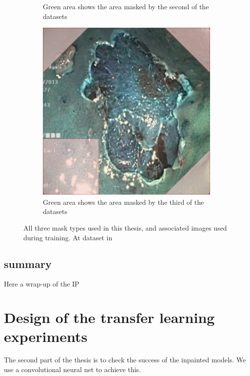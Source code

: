 \begin{figure}
\begin{subfigure}[b]{0.3\textwidth}
         \caption{Green area shows the area masked by the second of the datasets}
         \label{fig:GreenMask}
     \end{subfigure}     
     \hfill
     \begin{subfigure}[b]{0.3\textwidth}
         \centering
         \includegraphics[width=\textwidth]{methodology/figures/bothmask.png}
         \caption{Green area shows the area masked by the third of the datasets}
         \label{fig:BothMask}
     \end{subfigure}
     \caption{All three mask types used in this thesis, and associated images used during training. At dataset in}
     \label{fig:masks}
\end{figure}

\subsection{summary}
Here a wrap-up of the IP

\section{Design of the transfer learning experiments}
\label{cha:classifier}
The second part of the thesis is to check the success of the inpainted models. 
We use a convolutional neural net to achieve this.



